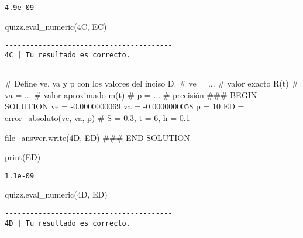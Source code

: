 \documentclass[
  letterpaper,
  DIV=11,
  numbers=noendperiod]{scrreprt}
\newenvironment{Shaded}{\begin{snugshade}}{\end{snugshade}}
\newcommand{\BuiltInTok}[1]{\textcolor[rgb]{0.00,0.23,0.31}{#1}}
\newcommand{\CommentTok}[1]{\textcolor[rgb]{0.37,0.37,0.37}{#1}}
\newcommand{\DecValTok}[1]{\textcolor[rgb]{0.68,0.00,0.00}{#1}}
\newcommand{\FloatTok}[1]{\textcolor[rgb]{0.68,0.00,0.00}{#1}}
\newcommand{\NormalTok}[1]{\textcolor[rgb]{0.00,0.23,0.31}{#1}}
\newcommand{\OperatorTok}[1]{\textcolor[rgb]{0.37,0.37,0.37}{#1}}
\newcommand{\RegionMarkerTok}[1]{\textcolor[rgb]{0.00,0.23,0.31}{#1}}
\newcommand{\StringTok}[1]{\textcolor[rgb]{0.13,0.47,0.30}{#1}}
\begin{document}
\begin{verbatim}
4.9e-09
\end{verbatim}

\begin{Shaded}
\begin{Highlighting}[]
\NormalTok{quizz.eval\_numeric(}\StringTok{\textquotesingle{}4C\textquotesingle{}}\NormalTok{, EC)}
\end{Highlighting}
\end{Shaded}

\begin{verbatim}
----------------------------------------
4C | Tu resultado es correcto.
----------------------------------------
\end{verbatim}

\begin{Shaded}
\begin{Highlighting}[]
\CommentTok{\# Define ve, va y p con los valores del inciso D.}
\CommentTok{\# ve = ... \# valor exacto R\textquotesingle{}(t) }
\CommentTok{\# va = ... \# valor aproximado m(t)}
\CommentTok{\# p = ...  \# precisión}
\CommentTok{\#\#\# }\RegionMarkerTok{BEGIN}\CommentTok{ SOLUTION}
\NormalTok{ve }\OperatorTok{=} \OperatorTok{{-}}\FloatTok{0.0000000069}
\NormalTok{va }\OperatorTok{=} \OperatorTok{{-}}\FloatTok{0.0000000058}
\NormalTok{p }\OperatorTok{=} \DecValTok{10}
\NormalTok{ED }\OperatorTok{=}\NormalTok{ error\_absoluto(ve, va, p) }\CommentTok{\# S = 0.3, t = 6, h = 0.1}

\NormalTok{file\_answer.write(}\StringTok{\textquotesingle{}4D\textquotesingle{}}\NormalTok{, ED)}
\CommentTok{\#\#\# }\RegionMarkerTok{END}\CommentTok{ SOLUTION}

\BuiltInTok{print}\NormalTok{(ED)}
\end{Highlighting}
\end{Shaded}

\begin{verbatim}
1.1e-09
\end{verbatim}

\begin{Shaded}
\begin{Highlighting}[]
\NormalTok{quizz.eval\_numeric(}\StringTok{\textquotesingle{}4D\textquotesingle{}}\NormalTok{, ED)}
\end{Highlighting}
\end{Shaded}

\begin{verbatim}
----------------------------------------
4D | Tu resultado es correcto.
----------------------------------------
\end{verbatim}
\end{document}
